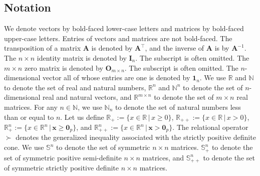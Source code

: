 \documentclass[10pt,onecolumn]{article}
\theoremstyle{definition}
\theoremstyle{definition}
\theoremstyle{definition}
\theoremstyle{definition}
\theoremstyle{definition}
\theoremstyle{theorem}
\newcommand{\0}{{\bm{0}}}
\newcommand{\1}{{\bm{1}}}
\newcommand{\x}{{\bm{x}}}
\newcommand{\vA}{{\bm{A}}}
\newcommand{\vE}{{\bm{E}}}
\newcommand{\vI}{{\bm{I}}}
\newcommand{\bN}{{\mathbb{N}}}
\newcommand{\vO}{{\bm{O}}}
\newcommand{\bR}{{\mathbb{R}}}
\newcommand{\bS}{{\mathbb{S}}}
\newcommand{\X}{{\bm{X}}}
\begin{document}
\subsection{Notation}
%
%
We denote vectors by bold-faced lower-case letters and
matrices by bold-faced upper-case letters.
%
Entries of vectors and matrices are not bold-faced.
%
The transposition of a matrix $\vA$ is denoted by $\vA^{\top}$,
and the inverse of $\vA$ is by $\vA^{-1}$.
%
The $n\times n$ identity matrix is denoted by $\vI_{n}$.
The subscript is often omitted.
%
The $m\times n$ zero matrix is denoted by $\vO_{m\times n}$.
The subscript is often omitted.
%
The $n$-dimensional vector all of whose entries are one is denoted by $\1_{n}$.
We use $\bR$ and $\bN$ to denote the set of real and natural numbers,
$\bR^{n}$ and $\bN^{n}$ to denote the set of $n$-dimensional real and natural vectors,
and $\bR^{m\times n}$ to denote the set of $m\times n$ real matrices.
%
For any $n\in\bN$, we use $\bN_{n}$ to denote the set of natural numbers less than or equal to $n$.
%
%
%
%
Let us define
$\bR_{+}:=\{ x\in\bR \,|\, x\ge 0 \}$,
$\bR_{++}:=\{ x\in\bR \,|\, x> 0 \}$,
$\bR_{+}^{n}:=\{ x\in\bR^{n} \,|\, \x\ge \0_{p} \}$, and
$\bR_{++}^{n}:=\{ x\in\bR^{n} \,|\, \x> \0_{p} \}$.
%
The relational operator $\succ$ denotes the generalized inequality
associated with the strictly positive definite cone.
%
We use
$\bS^{n}$ to denote the set of symmetric $n\times n$ matrices.
$\bS_{+}^{n}$ to denote the set of symmetric positive semi-definite $n\times n$ matrices,
and
$\bS_{++}^{n}$ to denote the set of symmetric strictly positive definite $n\times n$ matrices.
%
\end{document}
